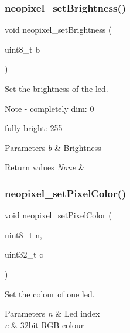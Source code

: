 \subsubsection{\texorpdfstring{neopixel\+\_\+set\+Brightness()}{neopixel\_setBrightness()}}
{\footnotesize\ttfamily void neopixel\+\_\+set\+Brightness (\begin{DoxyParamCaption}\item[{uint8\+\_\+t}]{b }\end{DoxyParamCaption})}



Set the brightness of the led. 

\begin{DoxyNote}{Note}
-\/ completely dim\+: 0
\begin{DoxyItemize}
\item fully bright\+: 255 
\end{DoxyItemize}
\end{DoxyNote}

\begin{DoxyParams}{Parameters}
{\em b} & Brightness \\
\hline
\end{DoxyParams}

\begin{DoxyRetVals}{Return values}
{\em None} & \\
\hline
\end{DoxyRetVals}
\mbox{\label{group___neo_pixel_ga71a91c14cda530d83c6bbb241fc9bf96}} 
\subsubsection{\texorpdfstring{neopixel\+\_\+set\+Pixel\+Color()}{neopixel\_setPixelColor()}}
{\footnotesize\ttfamily void neopixel\+\_\+set\+Pixel\+Color (\begin{DoxyParamCaption}\item[{uint8\+\_\+t}]{n,  }\item[{uint32\+\_\+t}]{c }\end{DoxyParamCaption})}



Set the colour of one led. 


\begin{DoxyParams}{Parameters}
{\em n} & Led index \\
\hline
{\em c} & 32bit R\+GB colour \\
\hline
\end{DoxyParams}

